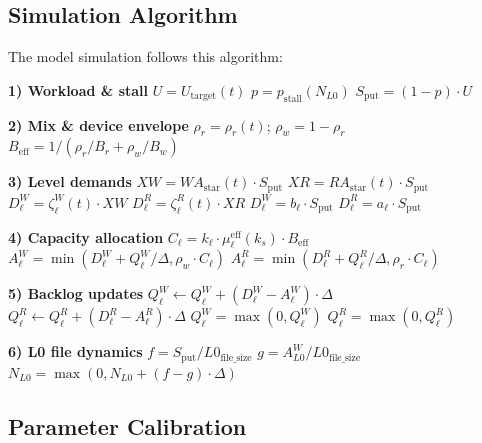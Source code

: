 \documentclass[11pt]{article}
\begin{document}



\subsection{Simulation Algorithm}

The model simulation follows this algorithm:

\begin{algorithm}[H]
\caption{Model Simulation Algorithm}
\begin{algorithmic}[1]
\FOR{$t \in [0, T)$ step $\Delta$}
    \STATE \textbf{1) Workload \& stall}
    \STATE $U = U_{\text{target}}(t)$
    \STATE $p = p_{\text{stall}}(N_{L0})$
    \STATE $S_{\text{put}} = (1 - p) \cdot U$
    
    \STATE \textbf{2) Mix \& device envelope}
    \STATE $\rho_r = \rho_r(t)$; $\rho_w = 1 - \rho_r$
    \STATE $B_{\text{eff}} = 1 / (\rho_r/B_r + \rho_w/B_w)$
    
    \STATE \textbf{3) Level demands}
        \STATE $XW = WA_{\text{star}}(t) \cdot S_{\text{put}}$
        \STATE $XR = RA_{\text{star}}(t) \cdot S_{\text{put}}$
        \STATE $D^W_\ell = \zeta^W_\ell(t) \cdot XW$
        \STATE $D^R_\ell = \zeta^R_\ell(t) \cdot XR$
    \ELSE
        \STATE $D^W_\ell = b_\ell \cdot S_{\text{put}}$
        \STATE $D^R_\ell = a_\ell \cdot S_{\text{put}}$
    \ENDIF
    
    \STATE \textbf{4) Capacity allocation}
    \STATE $C_\ell = k_\ell \cdot \mu_\ell^{\text{eff}}(k_s) \cdot B_{\text{eff}}$
    \STATE $A^W_\ell = \min(D^W_\ell + Q^W_\ell/\Delta, \rho_w \cdot C_\ell)$
    \STATE $A^R_\ell = \min(D^R_\ell + Q^R_\ell/\Delta, \rho_r \cdot C_\ell)$
    
    \STATE \textbf{5) Backlog updates}
    \STATE $Q^W_\ell \leftarrow Q^W_\ell + (D^W_\ell - A^W_\ell) \cdot \Delta$
    \STATE $Q^R_\ell \leftarrow Q^R_\ell + (D^R_\ell - A^R_\ell) \cdot \Delta$
    \STATE $Q^W_\ell = \max(0, Q^W_\ell)$
    \STATE $Q^R_\ell = \max(0, Q^R_\ell)$
    
    \STATE \textbf{6) L0 file dynamics}
    \STATE $f = S_{\text{put}} / L0_{\text{file\_size}}$
    \STATE $g = A^W_{L0} / L0_{\text{file\_size}}$
    \STATE $N_{L0} = \max(0, N_{L0} + (f - g) \cdot \Delta)$
\ENDFOR
\end{algorithmic}
\end{algorithm}

\subsection{Parameter Calibration}
\end{document}
